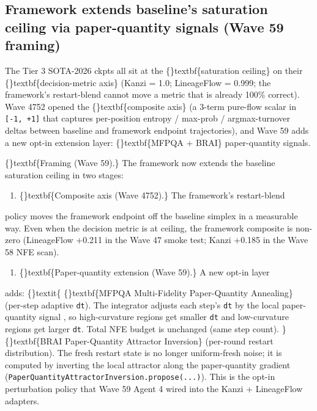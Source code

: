 \documentclass{article}
\begin{document}
\subsection{Framework extends baseline's saturation ceiling via paper-quantity signals (Wave 59 framing)}
The Tier 3 SOTA-2026 ckpts all sit at the \{\}textbf\{saturation ceiling\} on their \{\}textbf\{decision-metric axis\} (Kanzi  = 1.0; LineageFlow  = 0.999; the framework's restart-blend cannot move a metric that is already 100\% correct). Wave 4752 opened the \{\}textbf\{composite axis\} (a 3-term pure-flow scalar in \texttt{[-1, +1]} that captures per-position entropy / max-prob / argmax-turnover deltas between baseline and framework endpoint trajectories), and Wave 59 adds a new opt-in extension layer: \{\}textbf\{MFPQA + BRAI\} paper-quantity signals.

\{\}textbf\{Framing (Wave 59).\} The framework now extends the baseline saturation ceiling in two stages:

\begin{enumerate}
\item \{\}textbf\{Composite axis (Wave 4752).\} The framework's restart-blend
\end{enumerate}
policy moves the framework endpoint off the baseline simplex in a measurable way. Even when the decision metric is at ceiling, the framework composite is non-zero (LineageFlow +0.211 in the Wave 47 smoke test; Kanzi +0.185 in the Wave 58 NFE scan).

\begin{enumerate}
\item \{\}textbf\{Paper-quantity extension (Wave 59).\} A new opt-in layer
\end{enumerate}
adds: \{\}textit\{ \{\}textbf\{MFPQA  Multi-Fidelity Paper-Quantity Annealing\} (per-step adaptive \texttt{dt}). The integrator adjusts each step's \texttt{dt} by the local paper-quantity signal , so high-curvature regions get smaller \texttt{dt} and low-curvature regions get larger \texttt{dt}. Total NFE budget is unchanged (same step count). \} \{\}textbf\{BRAI  Paper-Quantity Attractor Inversion\} (per-round restart distribution). The fresh restart state is no longer uniform-fresh noise; it is computed by inverting the local attractor along the paper-quantity gradient (\texttt{PaperQuantityAttractorInversion.propose(...)}). This is the opt-in perturbation policy that Wave 59 Agent 4 wired into the Kanzi + LineageFlow adapters.
\end{document}
